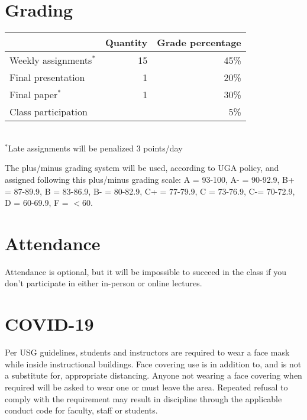 \documentclass[12pt]{article}
\begin{document}
\section*{\normalsize Grading}
\vspace{-4mm}
\begin{center}
  \begin{tabular}[h!]{lrr}
    \hline
                           & Quantity & Grade percentage         \\
    \hline
    Weekly assignments$^*$ & 15       & 45\%                     \\
    Final presentation     & 1        & 20\%                     \\
    Final paper$^{*}$      & 1        & 30\%                     \\
    Class participation    &          & 5\%                      \\
    \hline
  \end{tabular}                                                  \\
  \small
\hspace{0mm} $^*$Late assignments will be penalized 3 points/day \\ 
\end{center}
The plus/minus grading system will be used, according to UGA policy,
and assigned following this plus/minus grading scale: A = 93-100, A- =
90-92.9, B+ = 87-89.9, B = 83-86.9, B- = 80-82.9, C+ = 77-79.9, C =
73-76.9, C-= 70-72.9, D = 60-69.9, F = $<$60. 


\vspace{-2mm}
\section*{\normalsize Attendance}
\vspace{-4mm}
Attendance is optional, but it will be impossible to succeed in the
class if you don't participate in either in-person or online
lectures. 

\vspace{-2mm}
\section*{\normalsize COVID-19}
\vspace{-4mm}
Per USG guidelines, students and instructors are required to wear a
face mask while inside instructional buildings. Face covering use is
in addition to, and is not a substitute for, appropriate
distancing. Anyone not wearing a face covering when required will be
asked to wear one or must leave the area. Repeated refusal to comply
with the requirement may result in discipline through the applicable
conduct code for faculty, staff or students.
\end{document}
